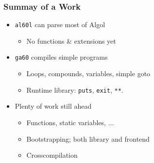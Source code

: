 \documentclass[14pt]{beamer}
\def\Algol{{\sc Algol}\space}
\begin{document}
\frame
{
  \frametitle{Summay of a Work}

  \begin{itemize}
  \item {\tt al60l} can parse most of \Algol 60
    \begin{itemize}
    \item No functions \& extensions yet
    \end{itemize}
  \item {\tt ga60} compiles simple programs
    \begin{itemize}
    \item Loops, compounds, variables, simple goto
    \item Runtime library: \texttt{puts}, \texttt{exit}, \texttt{**}.
    \end{itemize}
  \item Plenty of work still ahead
    \begin{itemize}
    \item Functions, static variables, ...
    \item Bootstrapping; both library and frontend
    \item Crosscompilation
    \end{itemize}
  \end{itemize}
}
\end{document}

